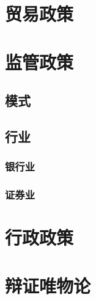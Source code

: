 \documentclass[12pt]{book}
\begin{document}
\chapter{贸易政策}



\chapter{监管政策}


\section{模式}



\section{行业}


\subsection{银行业}



\subsection{证券业}


\chapter{行政政策}




\chapter{辩证唯物论}
\end{document}

